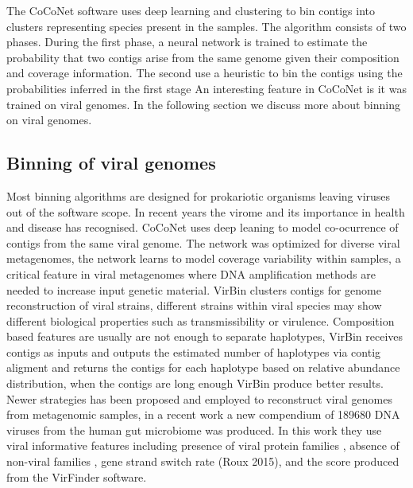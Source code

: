 \documentclass{article}
\begin{document}
The CoCoNet software uses deep learning and clustering to bin contigs into clusters representing species present in the samples.
The algorithm consists of two phases.
During the first phase, a neural network is trained to estimate the probability that two contigs arise from the same genome given their composition and coverage information.
The second use a heuristic to bin the contigs using the probabilities inferred in the first stage
An interesting feature in CoCoNet is it was trained on viral genomes. In the following section we discuss more about binning on viral genomes. 

\subsection{Binning of viral genomes}
Most binning algorithms are designed for prokariotic organisms leaving viruses out of the software scope.
In recent years the virome and its importance in health and disease has recognised.
CoCoNet uses deep leaning to model co-ocurrence of contigs from the same viral genome.
The network was optimized for diverse viral metagenomes, the network learns to model coverage variability within samples, a critical feature in viral metagenomes where DNA amplification methods are needed to increase input genetic material.
VirBin clusters contigs for genome reconstruction of viral strains, different strains within viral species may show different biological properties such as transmissibility or virulence. Composition based features are usually are not enough to separate haplotypes, VirBin receives contigs as inputs and outputs the estimated number of haplotypes via contig aligment and returns the contigs for each haplotype based on relative abundance distribution, when the contigs are long enough VirBin produce better results.
Newer strategies has been proposed and employed to reconstruct viral genomes from metagenomic samples, in a recent work \cite{nayfach2021metagenomic} a new compendium of 189680 DNA viruses from the human gut microbiome was produced.
In this work they use viral informative features including presence of viral protein families \cite{paez2016uncovering}, absence of non-viral families \cite{el2019pfam}, gene strand switch rate (Roux 2015), and the score produced from the VirFinder \cite{ren2017virfinder} software.
\end{document}
